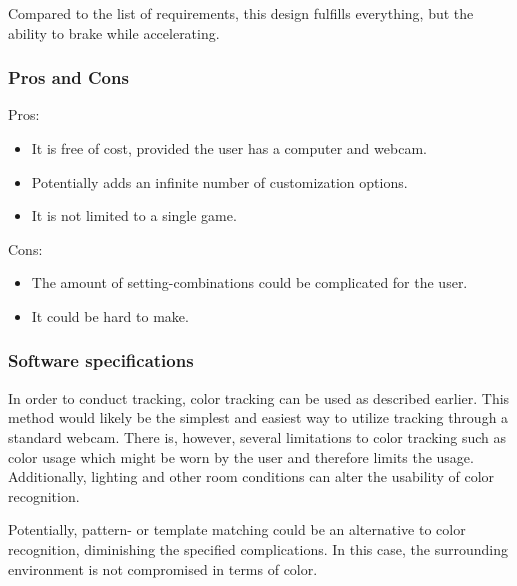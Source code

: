 Compared to the list of requirements, this design fulfills everything, but the ability to brake while accelerating.


\pagebreak[2]
\subsubsection*{Pros and Cons}
Pros:
\begin{itemize}
\item It is free of cost, provided the user has a computer and webcam.
\item Potentially adds an infinite number of customization options.
\item It is not limited to a single game.
	\end{itemize}
Cons:
\begin{itemize}
\item The amount of setting-combinations could be complicated for the user.
\item It could be hard to make.
\end{itemize}

\subsubsection*{Software specifications}
In order to conduct tracking, color tracking can be used as described earlier. This method would likely be the simplest and easiest way to utilize tracking through a standard webcam. There is, however, several limitations to color tracking such as color usage which might be worn by the user and therefore limits the usage. Additionally, lighting and other room conditions can alter the usability of color recognition.

Potentially, pattern- or template matching could be an alternative to color recognition, diminishing the specified complications. In this case, the surrounding environment is not compromised in terms of color.

\pagebreak[2]